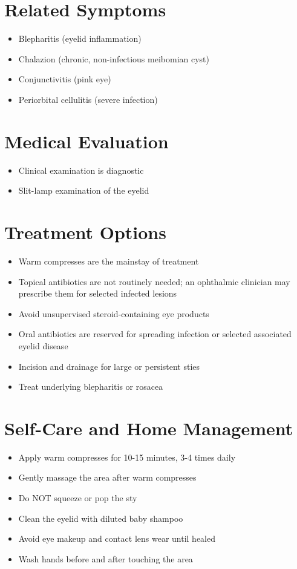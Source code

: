 \section*{Related Symptoms}
\begin{itemize}
\item Blepharitis (eyelid inflammation)
\item Chalazion (chronic, non-infectious meibomian cyst)
\item Conjunctivitis (pink eye)
\item Periorbital cellulitis (severe infection)
\end{itemize}

\section*{Medical Evaluation}
\begin{itemize}
\item Clinical examination is diagnostic
\item Slit-lamp examination of the eyelid
\end{itemize}

\section*{Treatment Options}
\begin{itemize}
\item Warm compresses are the mainstay of treatment
\item Topical antibiotics are not routinely needed; an ophthalmic clinician may prescribe them for selected infected lesions
\item Avoid unsupervised steroid-containing eye products
\item Oral antibiotics are reserved for spreading infection or selected associated eyelid disease
\item Incision and drainage for large or persistent sties
\item Treat underlying blepharitis or rosacea
\end{itemize}

\section*{Self-Care and Home Management}
\begin{itemize}
\item Apply warm compresses for 10-15 minutes, 3-4 times daily
\item Gently massage the area after warm compresses
\item Do NOT squeeze or pop the sty
\item Clean the eyelid with diluted baby shampoo
\item Avoid eye makeup and contact lens wear until healed
\item Wash hands before and after touching the area
\end{itemize}

